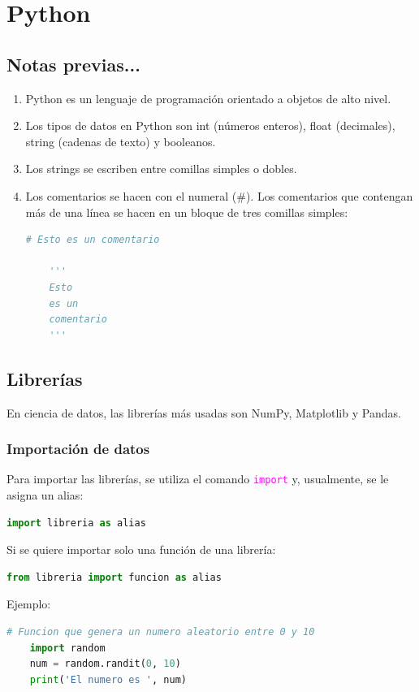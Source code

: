 \documentclass[a4paper, 12pt]{book}
\begin{document}
\chapter{Python}
\lstset{style=estilopython}
\section{Notas previas...}
\begin{enumerate}
\item Python es un lenguaje de programación orientado a objetos de alto nivel.
\item Los tipos de datos en Python son int (números enteros), float (decimales), string (cadenas de texto) y booleanos.
\item Los strings se escriben entre comillas simples o dobles.
\item Los comentarios se hacen con el numeral ($\#$). Los comentarios que contengan más de una línea se hacen en un bloque de tres comillas simples:
\begin{lstlisting}[language=Python]
	# Esto es un comentario
	
	'''
	Esto
	es un
	comentario
	'''
\end{lstlisting}
\end{enumerate}

\section{Librerías}
En ciencia de datos, las librerías más usadas son NumPy, Matplotlib y Pandas.
\subsection{Importación de datos}
Para importar las librerías, se utiliza el comando \texttt{\textcolor{magenta}{import}} y, usualmente, se le asigna un alias:
\begin{lstlisting}[language=Python]
	import libreria as alias
\end{lstlisting}
Si se quiere importar solo una función de una librería:
\begin{lstlisting}[language=Python]
	from libreria import funcion as alias
\end{lstlisting}
Ejemplo:
\begin{lstlisting}[language=Python]
	# Funcion que genera un numero aleatorio entre 0 y 10
	import random
	num = random.randit(0, 10)
	print('El numero es ', num)
\end{lstlisting}
\end{document}
